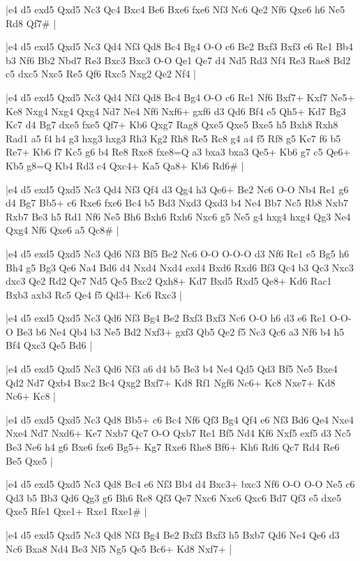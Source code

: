 \whitename{}
\blackname{}
\makegametitle
|e4 d5 exd5 Qxd5 Nc3 Qc4 Bxc4 Be6 Bxe6 fxe6 Nf3 Nc6 Qe2 Nf6 Qxe6 h6 Ne5 Rd8 Qf7\#  |

\whitename{}
\blackname{}
\makegametitle
|e4 d5 exd5 Qxd5 Nc3 Qd4 Nf3 Qd8 Bc4 Bg4 O-O c6 Be2 Bxf3 Bxf3 e6 Re1 Bb4 b3 Nf6 Bb2 Nbd7 Re3 Bxc3 Bxc3 O-O Qe1 Qe7 d4 Nd5 Rd3 Nf4 Re3 Rae8 Bd2 c5 dxc5 Nxc5 Re5 Qf6 Rxc5 Nxg2 Qe2 Nf4  |

\whitename{}
\blackname{}
\makegametitle
|e4 d5 exd5 Qxd5 Nc3 Qd4 Nf3 Qd8 Bc4 Bg4 O-O c6 Re1 Nf6 Bxf7+ Kxf7 Ne5+ Ke8 Nxg4 Nxg4 Qxg4 Nd7 Ne4 Nf6 Nxf6+ gxf6 d3 Qd6 Bf4 e5 Qh5+ Kd7 Bg3 Kc7 d4 Bg7 dxe5 fxe5 Qf7+ Kb6 Qxg7 Rag8 Qxe5 Qxe5 Bxe5 h5 Bxh8 Rxh8 Rad1 a5 f4 h4 g3 hxg3 hxg3 Rh3 Kg2 Rh8 Re5 Rc8 g4 a4 f5 Rf8 g5 Kc7 f6 b5 Re7+ Kb6 f7 Kc5 g6 b4 Re8 Rxe8 fxe8=Q a3 bxa3 bxa3 Qe5+ Kb6 g7 c5 Qe6+ Kb5 g8=Q Kb4 Rd3 c4 Qxc4+ Ka5 Qa8+ Kb6 Rd6\#  |

\whitename{}
\blackname{}
\makegametitle
|e4 d5 exd5 Qxd5 Nc3 Qd4 Nf3 Qf4 d3 Qg4 h3 Qe6+ Be2 Nc6 O-O Nb4 Re1 g6 d4 Bg7 Bb5+ c6 Rxe6 fxe6 Bc4 b5 Bd3 Nxd3 Qxd3 b4 Ne4 Bb7 Nc5 Rb8 Nxb7 Rxb7 Be3 h5 Rd1 Nf6 Ne5 Bh6 Bxh6 Rxh6 Nxc6 g5 Ne5 g4 hxg4 hxg4 Qg3 Ne4 Qxg4 Nf6 Qxe6 a5 Qc8\#  |

\whitename{}
\blackname{}
\makegametitle
|e4 d5 exd5 Qxd5 Nc3 Qd6 Nf3 Bf5 Be2 Nc6 O-O O-O-O d3 Nf6 Re1 e5 Bg5 h6 Bh4 g5 Bg3 Qe6 Na4 Bd6 d4 Nxd4 Nxd4 exd4 Bxd6 Rxd6 Bf3 Qc4 b3 Qc3 Nxc3 dxc3 Qe2 Rd2 Qe7 Nd5 Qe5 Bxc2 Qxh8+ Kd7 Bxd5 Rxd5 Qe8+ Kd6 Rac1 Bxb3 axb3 Rc5 Qe4 f5 Qd3+ Kc6 Rxc3  |

\whitename{}
\blackname{}
\makegametitle
|e4 d5 exd5 Qxd5 Nc3 Qd6 Nf3 Bg4 Be2 Bxf3 Bxf3 Nc6 O-O h6 d3 e6 Re1 O-O-O Be3 b6 Ne4 Qb4 b3 Ne5 Bd2 Nxf3+ gxf3 Qb5 Qe2 f5 Nc3 Qc6 a3 Nf6 b4 h5 Bf4 Qxc3 Qe5 Bd6  |

\whitename{}
\blackname{}
\makegametitle
|e4 d5 exd5 Qxd5 Nc3 Qd6 Nf3 a6 d4 b5 Be3 b4 Ne4 Qd5 Qd3 Bf5 Ne5 Bxe4 Qd2 Nd7 Qxb4 Bxc2 Bc4 Qxg2 Bxf7+ Kd8 Rf1 Ngf6 Nc6+ Kc8 Nxe7+ Kd8 Nc6+ Kc8  |

\whitename{}
\blackname{}
\makegametitle
|e4 d5 exd5 Qxd5 Nc3 Qd8 Bb5+ c6 Bc4 Nf6 Qf3 Bg4 Qf4 e6 Nf3 Bd6 Qe4 Nxe4 Nxe4 Nd7 Nxd6+ Ke7 Nxb7 Qc7 O-O Qxb7 Re1 Bf5 Nd4 Kf6 Nxf5 exf5 d3 Nc5 Be3 Ne6 h4 g6 Bxe6 fxe6 Bg5+ Kg7 Rxe6 Rhe8 Bf6+ Kh6 Rd6 Qc7 Rd4 Re6 Be5 Qxe5  |

\whitename{}
\blackname{}
\makegametitle
|e4 d5 exd5 Qxd5 Nc3 Qd8 Bc4 e6 Nf3 Bb4 d4 Bxc3+ bxc3 Nf6 O-O O-O Ne5 c6 Qd3 b5 Bb3 Qd6 Qg3 g6 Bh6 Re8 Qf3 Qe7 Nxc6 Nxc6 Qxc6 Bd7 Qf3 e5 dxe5 Qxe5 Rfe1 Qxe1+ Rxe1 Rxe1\#  |

\whitename{}
\blackname{}
\makegametitle
|e4 d5 exd5 Qxd5 Nc3 Qd8 Nf3 Bg4 Be2 Bxf3 Bxf3 h5 Bxb7 Qd6 Ne4 Qe6 d3 Nc6 Bxa8 Nd4 Be3 Nf5 Ng5 Qe5 Bc6+ Kd8 Nxf7+  |

